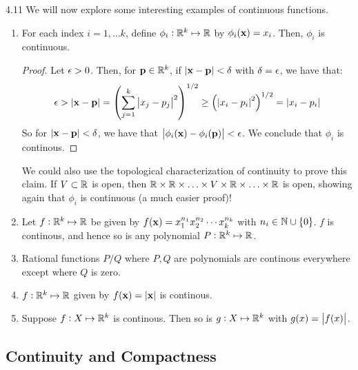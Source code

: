 \begin{example}{}{4.11}
    We will now explore some interesting examples of continuous functions.
    \begin{enumerate}
        \item For each index $i = 1, \ldots k$, define $\phi_i: \mathbb{R}^k \mapsto \mathbb{R}$ by $\phi_i(\mathbf{x}) = x_i$. Then, $\phi_i$ is continuous.
        \begin{proof}
            Let $\epsilon > 0$. Then, for $\mathbf{p} \in \mathbb{R}^k$, if $\abs{\mathbf{x} - \mathbf{p}} < \delta$ with $\delta = \epsilon$, we have that:
            \begin{align*}
                \epsilon > \abs{\mathbf{x} - \mathbf{p}} = \left(\sum_{j=1}^k \abs{x_j - p_j}^2\right)^{1/2} \geq \left(\abs{x_i - p_i}^2\right)^{1/2} = \abs{x_i - p_i}
            \end{align*}
            So for $\abs{\mathbf{x} - \mathbf{p}} < \delta$, we have that $\abs{\phi_i(\mathbf{x}) - \phi_i(\mathbf{p})} < \epsilon$. We conclude that $\phi_i$ is continous.
        \end{proof}
        We could also use the topological characterization of continuity to prove this claim. If $V \subset \mathbb{R}$ is open, then $\mathbb{R} \times \mathbb{R} \times \ldots \times V \times \mathbb{R} \times \ldots \times \mathbb{R}$ is open, showing again that $\phi_i$ is continuous (a much easier proof)!
        \item Let $f: \mathbb{R}^k \mapsto \mathbb{R}$ be given by $f(\mathbf{x}) = x_1^{n_1}x_2^{n_2}\cdots x_k^{n_k}$ with $n_i \in \mathbb{N} \cup \set{0}$. $f$ is continous, and hence so is any polynomial $P: \mathbb{R}^k \mapsto \mathbb{R}$.
        \item Rational functions $P/Q$ where $P, Q$ are polynomials are continous everywhere except where $Q$ is zero.
        \item $f: \mathbb{R}^k \mapsto \mathbb{R}$ given by $f(\mathbf{x}) = \abs{\mathbf{x}}$ is continous.
        \item Suppose $f: X \mapsto \mathbb{R}^k$ is continous. Then so is $g: X \mapsto \mathbb{R}^k$ with $g(x) = \abs{f(x)}$.
    \end{enumerate}
\end{example}

\subsection{Continuity and Compactness}

